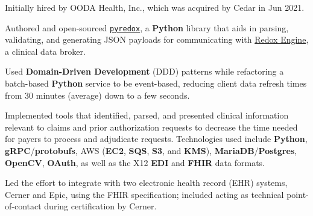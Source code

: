 

\begin{rExperience}

  \item Initially hired by OODA Health, Inc., which was acquired by Cedar in Jun 2021.

  \item Authored and open-sourced \href{https://github.com/cedar-team/pyredox}{\texttt{pyredox}}, a \textbf{Python}
    library that aids in parsing, validating, and generating JSON payloads for communicating with
    \href{https://www.redoxengine.com/}{Redox Engine}, a clinical data broker.


  \item Used \textbf{Domain-Driven Development} (DDD) patterns while refactoring a batch-based \textbf{Python} service
    to be event-based, reducing client data refresh times from 30 minutes (average) down to a few seconds.

  \item Implemented tools that identified, parsed, and presented clinical information relevant to claims and prior
    authorization requests to decrease the time needed for
    payers
    to process and adjudicate
    requests. Technologies used include \textbf{Python}, \textbf{gRPC}/\textbf{protobufs}, AWS (\textbf{EC2},
    \textbf{SQS}, \textbf{S3}, and \textbf{KMS}), \textbf{MariaDB}/\textbf{Postgres}, \textbf{OpenCV}, \textbf{OAuth},
    as well as the X12 \textbf{EDI} and \textbf{FHIR} data formats.

  \item Led the effort to integrate with two electronic health record (EHR) systems, Cerner and Epic, using the
    FHIR specification; included acting as technical point-of-contact during certification by Cerner.


\end{rExperience}

